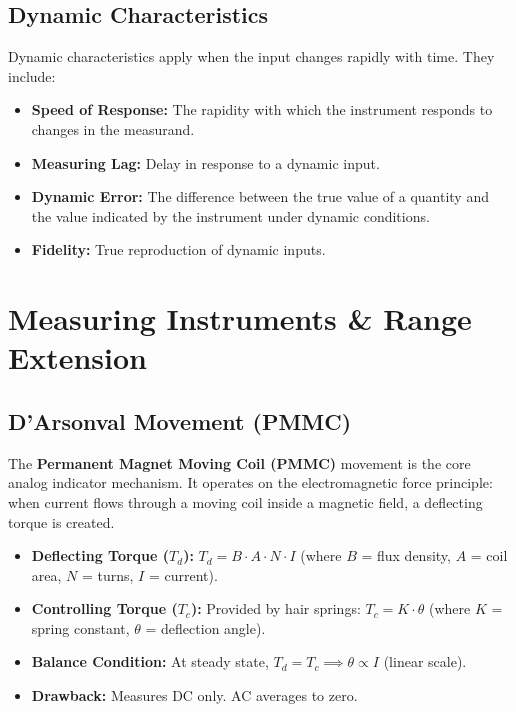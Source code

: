 \documentclass[12pt,a4paper]{article}
\begin{document}
\subsection{Dynamic Characteristics}
Dynamic characteristics apply when the input changes rapidly with time. They include:
\begin{itemize}[leftmargin=*, itemsep=2.5pt]
  \item \textbf{Speed of Response:} The rapidity with which the instrument responds to changes in the measurand.
  \item \textbf{Measuring Lag:} Delay in response to a dynamic input.
  \item \textbf{Dynamic Error:} The difference between the true value of a quantity and the value indicated by the instrument under dynamic conditions.
  \item \textbf{Fidelity:} True reproduction of dynamic inputs.
\end{itemize}

\section{Measuring Instruments \& Range Extension}

\subsection{D'Arsonval Movement (PMMC)}
The \textbf{Permanent Magnet Moving Coil (PMMC)} movement is the core analog indicator mechanism. It operates on the electromagnetic force principle: when current flows through a moving coil inside a magnetic field, a deflecting torque is created.
\begin{itemize}[leftmargin=*, itemsep=3.5pt]
  \item \textbf{Deflecting Torque ($T_d$):} $T_d = B \cdot A \cdot N \cdot I$ (where $B$ = flux density, $A$ = coil area, $N$ = turns, $I$ = current).
  \item \textbf{Controlling Torque ($T_c$):} Provided by hair springs: $T_c = K \cdot \theta$ (where $K$ = spring constant, $\theta$ = deflection angle).
  \item \textbf{Balance Condition:} At steady state, $T_d = T_c \implies \theta \propto I$ (linear scale).
  \item \textbf{Drawback:} Measures DC only. AC averages to zero.
\end{itemize}
\end{document}
